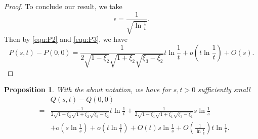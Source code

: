 \documentclass[11pt]{amsart}
\theoremstyle{plain}
\newtheorem{Proposition}[Theorem]{Proposition}
\begin{document}
\begin{proof}
To conclude our result, we take $$\epsilon=\frac{1}{\sqrt{\ln \frac{1}{t}}}.$$
Then by \eqref{equ:P2} and \eqref{equ:P3}, we have
 $$P(s,t)-P(0,0)=\frac{1}{2\sqrt{1-\xi_2}\sqrt{1+\xi_2}\sqrt{\xi_3-\xi_2}}t\ln \frac{1}{t}+o\left(t\ln \frac{1}{t}\right)+ O(s).$$
 \end{proof}

\begin{Proposition}\label{prop:Q}
    With the about notation, we have for $s,t>0$ sufficiently small
\begin{eqnarray*}
 && Q(s,t)-Q(0,0) \\
 &=& \frac{-1}{2\sqrt{1-\xi_2}\sqrt{1+\xi_2}\sqrt{\xi_3-\xi_2}} t \ln \frac{1}{t}+\frac{1}{2\sqrt{1-\xi_1}\sqrt{1+\xi_1}\sqrt{\xi_3-\xi_1}} s\ln \frac{1}{s}\\
  &&+o\left(s\ln \frac{1}{s}\right)+o\left(t\ln \frac{1}{t}\right)+  O(t)s\ln \frac{1}{s} + O\left(\frac{1}{\ln \frac{1}{s}}\right) t \ln \frac{1}{t}.
\end{eqnarray*}
\end{Proposition}
\end{document}
